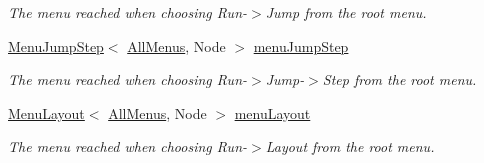 \begin{DoxyCompactItemize}
\begin{DoxyCompactList}\small\item\em The menu reached when choosing Run-\/$>$Jump from the root menu. \end{DoxyCompactList}\item 
\hyperlink{structslb_1_1core_1_1ui_1_1MenuJumpStep}{Menu\+Jump\+Step}$<$ \hyperlink{structslb_1_1core_1_1ui_1_1AllMenus}{All\+Menus}, Node $>$ \hyperlink{structslb_1_1core_1_1ui_1_1AllMenus_aa39e38f57bb86499ad1f507661bacad9}{menu\+Jump\+Step}\hypertarget{structslb_1_1core_1_1ui_1_1AllMenus_aa39e38f57bb86499ad1f507661bacad9}{}\label{structslb_1_1core_1_1ui_1_1AllMenus_aa39e38f57bb86499ad1f507661bacad9}

\begin{DoxyCompactList}\small\item\em The menu reached when choosing Run-\/$>$Jump-\/$>$Step from the root menu. \end{DoxyCompactList}\item 
\hyperlink{structslb_1_1core_1_1ui_1_1MenuLayout}{Menu\+Layout}$<$ \hyperlink{structslb_1_1core_1_1ui_1_1AllMenus}{All\+Menus}, Node $>$ \hyperlink{structslb_1_1core_1_1ui_1_1AllMenus_a8bde72e39ba430d5cc64c44b3f07c1c6}{menu\+Layout}\hypertarget{structslb_1_1core_1_1ui_1_1AllMenus_a8bde72e39ba430d5cc64c44b3f07c1c6}{}\label{structslb_1_1core_1_1ui_1_1AllMenus_a8bde72e39ba430d5cc64c44b3f07c1c6}

\begin{DoxyCompactList}\small\item\em The menu reached when choosing Run-\/$>$Layout from the root menu. \end{DoxyCompactList}\end{DoxyCompactItemize}
